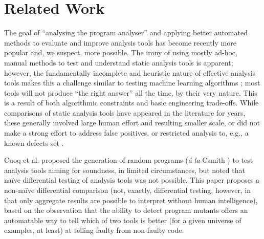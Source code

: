 \section{Related Work}

The goal of ``analysing the program analyser'' \cite{cadar2016analysing} and applying better automated methods to evaluate and improve analysis tools has become recently more popular and, we suspect, more possible.  The irony of using mostly ad-hoc, manual methods to test and understand static analysis tools is apparent; however, the fundamentally incomplete and heuristic nature of effective analysis tools makes this a challenge similar to testing machine learning algorithms \cite{OnlyOracle}; most tools will not produce ``the right answer'' all the time, by their very nature.  This is a result of both algorithmic constraints and basic engineering trade-offs.  While comparisons of static analysis tools \cite{CompareJavaTools,durieux2019empirical, Parizi,slither} have appeared in the literature for years, these generally involved large human effort and resulting smaller scale, or did not make a strong effort to address false positives, or restricted analysis to, e.g., a known defects set \cite{AllBugs}.

Cuoq et al. \cite{regehrRandom} proposed the generation of random programs (\emph{\'a la} Csmith \cite{csmith}) to test analysis tools aiming for soundness, in limited circumstances, but noted that na\"ive differential testing of analysis tools was not possible.  This paper proposes a non-na\"ive differential comparison (not, exactly, differential testing, however, in that only aggregate results are possible to interpret without human intelligence), based on the observation that the ability to detect program mutants offers an automatable way to tell which of two tools is better (for a given universe of examples, at least) at telling faulty from non-faulty code.

